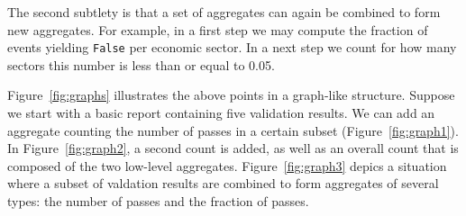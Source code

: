 \documentclass[a4paper, 11pt]{article}
\newcommand{\onwaar}{{\normalfont \texttt{False}}}
\begin{document}
The second subtlety is that a set of aggregates can again be combined to form
new aggregates. For example, in a first step we may compute the fraction of
events yielding \onwaar{} per economic sector. In a next step we count for how
many sectors this number is less than or equal to 0.05.

Figure~\ref{fig:graphs} illustrates the above points in a graph-like structure.
Suppose we start with a basic report containing five validation results. We can
add an aggregate counting the number of passes in a certain subset
(Figure~\ref{fig:graph1}).  In Figure~\ref{fig:graph2}, a second count is
added, as well as an overall count that is composed of the two low-level
aggregates. Figure~\ref{fig:graph3} depics a situation where a subset of
valdation results are combined to form aggregates of several types: the number
of passes and the fraction of passes.
%
\end{document}
